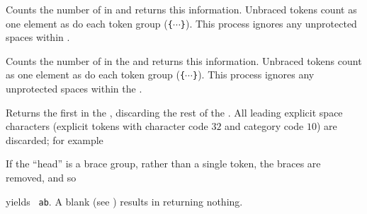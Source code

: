 \documentclass[oneside]{book}
\begin{document}
\begin{function}{\TlCount}
\begin{syntax}
 
\end{syntax}
Counts the number of  in  and returns this information.
Unbraced tokens count as one element as do each token group (\verb|{|$\cdots$\verb|}|).
This process ignores any unprotected spaces within . %
\begin{demohigh}
\end{demohigh}
\end{function}

\begin{function}{\TlVarCount}
\begin{syntax}
 
\end{syntax}
Counts the number of  in the  and returns this information.
Unbraced tokens count as one element as do each token group (\verb|{|$\cdots$\verb|}|).
This process ignores any unprotected spaces within the . %
\begin{demohigh}
\TlSet {}
\TlVarCount \lTmpaTl
\end{demohigh}
\end{function}

\begin{function}{\TlHead}
\begin{syntax}
 
\end{syntax}
Returns the first  in the ,
discarding the rest of the .
All leading explicit space characters
(explicit tokens with character code $32$ and category code $10$)
are discarded; for example
\begin{demohigh}
\end{demohigh}
If the \enquote{head} is a brace group, rather than a single token,
the braces are removed, and so
\begin{codehigh}
\end{codehigh}
yields \verb*| ab|.
A blank  (see ) results in
 returning nothing.
\end{function}
\end{document}
